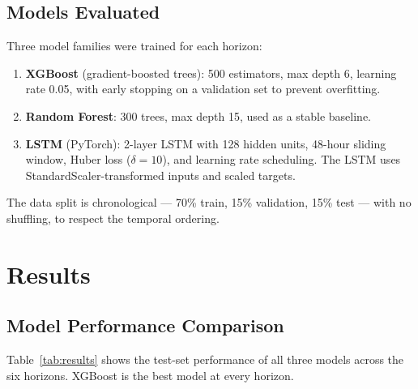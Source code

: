 \documentclass[12pt, a4paper]{article}
\begin{document}
\subsection{Models Evaluated}

Three model families were trained for each horizon:

\begin{enumerate}
  \item \textbf{XGBoost} (gradient-boosted trees): 500 estimators, max depth 6, learning rate 0.05, with early stopping on a validation set to prevent overfitting.
  \item \textbf{Random Forest}: 300 trees, max depth 15, used as a stable baseline.
  \item \textbf{LSTM} (PyTorch): 2-layer LSTM with 128 hidden units, 48-hour sliding window, Huber loss ($\delta=10$), and learning rate scheduling.  The LSTM uses StandardScaler-transformed inputs and scaled targets.
\end{enumerate}

The data split is chronological --- 70\% train, 15\% validation, 15\% test --- with no shuffling, to respect the temporal ordering.


\section{Results}

\subsection{Model Performance Comparison}

Table~\ref{tab:results} shows the test-set performance of all three models across the six horizons.  XGBoost is the best model at every horizon.
\end{document}
